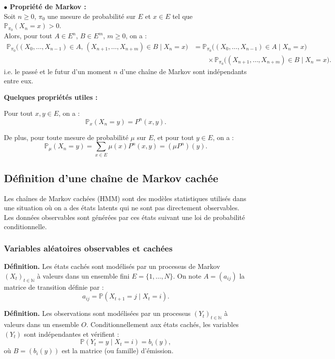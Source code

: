 \documentclass[11pt]{article}
\begin{document}
\textbf{$\bullet$ Propriété de Markov :} \\
Soit $n \ge 0$, $\pi_0$ une mesure de probabilité sur $E$ et $x \in E$ tel que $\mathbb{P}_{\pi_0}(X_n=x)>0$.\\
Alors, pour tout $A \in E^n$, $B \in E^m$, $m \ge 0$, on a :
\[
\begin{aligned}
\mathbb{P}_{\pi_0}\bigl((X_0,\ldots,X_{n-1}) \in A,\,(X_{n+1},\ldots,X_{n+m}) \in B \mid X_n=x\bigr)
&= \mathbb{P}_{\pi_0}\bigl((X_0,\ldots,X_{n-1}) \in A \mid X_n=x\bigr) \\
&\qquad \times \mathbb{P}_{\pi_0}\bigl((X_{n+1},\ldots,X_{n+m}) \in B \mid X_n=x\bigr).
\end{aligned}
\]
i.e. le passé et le futur d'un moment $n$ d'une chaîne de Markov sont indépendants entre eux.

\textbf{Quelques propriétés utiles :}

Pour tout $x,y \in E$, on a :
\[
\mathbb{P}_x(X_n = y) = P^n(x,y).
\]

De plus, pour toute mesure de probabilité $\mu$ sur $E$, et pour tout $y \in E$, on a :
\[
\mathbb{P}_{\mu}(X_n = y)
=
\sum_{x \in E} \mu(x)P^n(x,y)
=
(\mu P^n)(y).
\]


\subsection{Définition d'une chaîne de Markov cachée}

Les chaînes de Markov cachées (HMM) sont des modèles statistiques utilisés dans une situation où on a des états latents qui ne sont pas directement observables. Les données observables sont générées par ces états suivant une loi de probabilité conditionnelle.

\subsubsection{Variables aléatoires observables et cachées}

\textbf{Définition.} 
Les états cachés sont modélisés par un processus de Markov $(X_t)_{t \in \mathbb{N}}$ à valeurs dans un ensemble fini $E  = \{1,\dots,N\}$. 
On note $A = (a_{ij})$ la matrice de transition définie par :
\[
a_{ij} = \mathbb{P}(X_{t+1} = j \mid X_t = i).
\]

\vspace{0.3cm}

\textbf{Définition.} 
Les observations sont modélisées par un processus $(Y_t)_{t \in \mathbb{N}}$ à valeurs dans un ensemble $O$. 
Conditionnellement aux états cachés, les variables $(Y_t)$ sont indépendantes et vérifient :
\[
\mathbb{P}(Y_t = y \mid X_t = i) = b_i(y),
\]
où $B = (b_i(y))$ est la matrice (ou famille) d’émission.
\end{document}
